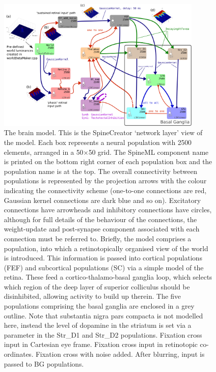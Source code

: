 \documentclass{frontiersSCNS}
\begin{document}
\begin{figure}[!ht]
\begin{center}
\includegraphics[width=0.9\textwidth]{./figures/Brain_Model.png}
\end{center}
\caption{ The brain model. This is the SpineCreator `network layer' view of
the model. Each box represents a neural population with 2500 elements,
arranged in a 50$\times$50 grid. The SpineML component name is printed
on the bottom right corner of each population box and the population
name is at the top. The overall connectivity between populations is
represented by the projection arrows with the colour indicating the
connectivity scheme (one-to-one connections are red, Gaussian kernel
connections are dark blue and so on). Excitatory connections have
arrowheads and inhibitory connections have circles, although for
full details of the behaviour of the connections, the weight-update and
post-synapse component associated with each connection must be
referred to. Briefly, the model comprises
a  population, into which a retinotopically organised view of
the world is introduced. This information is passed into cortical
populations (FEF) and subcortical populations (SC) via a simple model
of the retina. These feed a cortico-thalamo-basal ganglia loop, which
selects which region of the deep layer of superior colliculus should
be disinhibited, allowing activity to build up therein. The five
populations comprising the basal ganglia are enclosed in a grey
outline. Note that substantia nigra pars compacta is not modelled
here, instead the level of dopamine in the striatum is set via a
parameter in the Str\_D1 and Str\_D2
populations.  Fixation cross input in Cartesian eye
frame.  Fixation cross input in retinotopic
co-ordinates.  Fixation cross with noise added. 
After blurring, input is passed to BG populations.}
\label{fig:brainmodel}
\end{figure}
\end{document}
